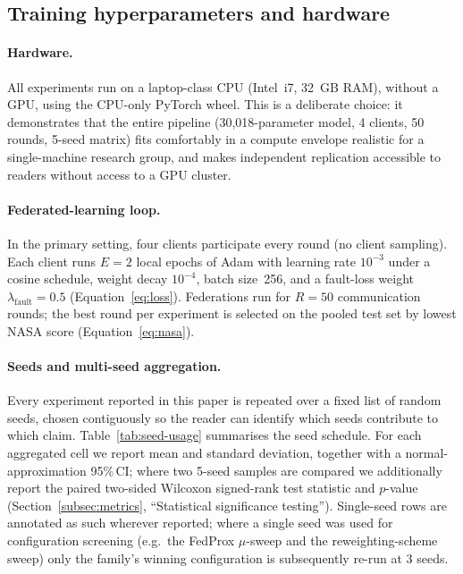\documentclass[a4paper,fleqn,doubleblind]{cas-sc}
\begin{document}
\subsection{Training hyperparameters and hardware}
\label{subsec:hyperparams}

\paragraph{Hardware.}
All experiments run on a laptop-class CPU (Intel~i7, 32~GB RAM),
without a GPU, using the CPU-only PyTorch wheel. This is a
deliberate choice: it demonstrates that the entire pipeline
(30{,}018-parameter model, 4 clients, 50 rounds, 5-seed matrix)
fits comfortably in a compute envelope realistic for a single-machine
research group, and makes independent replication accessible to
readers without access to a GPU cluster.

\paragraph{Federated-learning loop.}
In the primary setting, four clients participate every round (no
client sampling). Each client runs $E = 2$ local epochs of Adam with
learning rate $10^{-3}$ under a cosine schedule, weight decay
$10^{-4}$, batch size~256, and a fault-loss weight
$\lambda_{\mathrm{fault}} = 0.5$
(Equation~\ref{eq:loss}). Federations run for
$R = 50$ communication rounds; the best round per experiment is
selected on the pooled test set by lowest NASA score
(Equation~\ref{eq:nasa}).

\paragraph{Seeds and multi-seed aggregation.}
Every experiment reported in this paper is repeated over a fixed
list of random seeds, chosen contiguously so the reader can identify
which seeds contribute to which claim. Table~\ref{tab:seed-usage}
summarises the seed schedule. For each aggregated cell we report
mean and standard deviation, together with a normal-approximation
95\%\,CI; where two 5-seed samples are compared we additionally
report the paired two-sided Wilcoxon signed-rank test statistic and
$p$-value (Section~\ref{subsec:metrics}, ``Statistical significance
testing''). Single-seed rows are annotated as such wherever
reported; where a single seed was used for configuration screening
(e.g.\ the FedProx $\mu$-sweep and the reweighting-scheme sweep)
only the family's winning configuration is subsequently re-run at
3 seeds.
\end{document}
